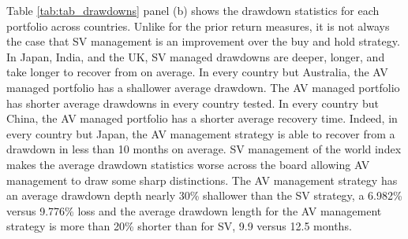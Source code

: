 %
%


%
Table \ref{tab:tab_drawdowns} panel (b) shows the drawdown statistics for each portfolio across countries. Unlike for the prior return measures, it is not always the case that SV management is an improvement over the buy and hold strategy. In Japan, India, and the UK, SV managed drawdowns are deeper, longer, and take longer to recover from on average. In every country but Australia, the AV managed portfolio has a shallower average drawdown. The AV managed portfolio has shorter average drawdowns in every country tested. In every country but China, the AV managed portfolio has a shorter average recovery time. Indeed, in every country but Japan, the AV management strategy is able to recover from a drawdown in less than 10 months on average. SV management of the world index makes the average drawdown statistics worse across the board allowing AV management to draw some sharp distinctions. The AV management strategy has an average drawdown depth nearly 30\% shallower than the SV strategy, a 6.982\% versus 9.776\% loss and the average drawdown length for the AV management strategy is more than 20\% shorter than for SV, 9.9 versus 12.5 months.

